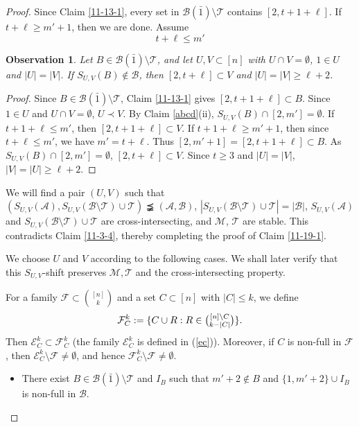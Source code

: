 \documentclass[11pt]{article}
\def\marrow{{\boldmath {\marginpar[\hfill$\rightarrow \rightarrow$]{$\leftarrow \leftarrow$}}}}
\def\andrey#1{{\sc Andrey: }{\marrow\sf \textcolor{blue}{#1}}}
\newcommand{\m}{\mathcal}
\newtheorem{obser}[theorem]{Observation}
\begin{document}
\begin{proof} 
Since Claim \ref{11-13-1}, every set in $\m B(\bar1) \setminus \m T$ contains $[2,t+1+\ell]$. 
If $t+\ell\ge m'+1$, then we are done. Assume 
\[
t+\ell\le m'
\]

\begin{obser}\label{obser3}
Let $B \in \m B(\bar1) \setminus \m T$, and let $U,V\subset [n]$ with $U\cap V=\emptyset$, $1\in U$ and $|U|=|V|$. If  $S_{U,V}(B)\not\in \m B$, then $[2,t+\ell]\subset V$ and $|U|=|V|\ge \ell+2$. 
\end{obser}

\begin{proof}
Since $B \in \m B(\bar1) \setminus \m T$, Claim \ref{11-13-1} gives $[2,t+1+\ell]\subset B$. 
Since $1\in U$ and $U\cap V=\emptyset$, $U\prec V$. 
By Claim \ref{abcd}(ii), $S_{U,V}(B)\cap [2,m']=\emptyset$.
If $t+1+\ell\le m'$, then $[2,t+1+\ell]\subset V$. 
If $t+1+\ell\ge m'+1$, then since $t+\ell \le m'$, we have $m'=t+\ell$. Thus $[2,m'+1]=[2,t+1+\ell]\subset B$.
As $S_{U,V}(B)\cap [2,m']=\emptyset$, $[2, t+\ell]\subset V$. Since $t\ge 3$ and $|U|=|V|$, $|V|=|U|\ge \ell+2$.
\end{proof}

We will find a pair $(U,V)$ such that $(S_{U,V}(\m A), S_{U,V}(\m B\setminus \m T)\cup \m T)\precneqq (\m A, \m B)$, $|S_{U,V}(\m B\setminus \m T)\cup \m T|=|\m B|$,
$S_{U,V}(\m A)$ and $S_{U,V}(\m B\setminus \m T)\cup \m T$ are cross-intersecting, and $\m M $, $\m T$ are stable. This contradicts Claim \ref{11-3-4}, thereby completing the proof of Claim \ref{11-19-1}. 

We choose $U$ and $V$ according to the following cases.  
We shall later verify that this $S_{U,V}$-shift preserves $\m M, \m T$ and the cross-intersecting property.

For a family $\m F\subset {[n]\choose k}$ and a set $C\subset [n]$ with $|C|\le k$, we define
\begin{equation}\label{fc}
    \mathcal{F}^k_C:=\{C\cup R: R\in \tbinom{[n]\setminus C}{ k-|C|}\}.
\end{equation}
Then $\mathcal{E}^k_C\subset \mathcal{F}^k_C$ (the family $\mathcal{E}^k_C$ is defined in (\ref{ec})). Moreover, if $C$ is non-full in $\m F$, then $\mathcal{E}^k_C\setminus \m F \ne \emptyset$, and hence
$\mathcal{F}^k_C\setminus \m F \ne \emptyset$. %

\begin{itemize}
\item[Case 1.] There exist $B\in \m B(\bar{1})\setminus \m T$ and $I_B$ such that $m'+2\not\in B $ and  $\{1,m'+2\}\cup I_B$ is non-full in $\m B$. 


\end{itemize}
\end{proof}
\end{document}
